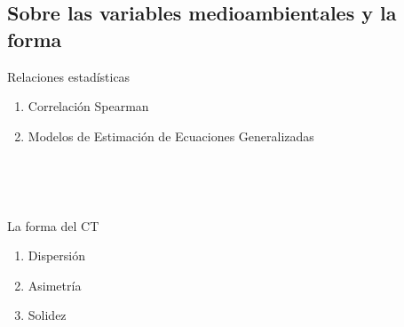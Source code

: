 \subsection{Sobre las variables medioambientales y la forma}

\begin{frame}
    \begin{alertblock}{Relaciones estadísticas}
        \begin{enumerate}
            \item Correlación Spearman
            \item Modelos de Estimación de Ecuaciones Generalizadas
        \end{enumerate}
        ~\
    \end{alertblock}
~\
    
    \begin{exampleblock}{La forma del CT}
        \begin{enumerate}
            \item Dispersión
            \item Asimetría
            \item Solidez
        \end{enumerate} 
        ~\
    \end{exampleblock}
\end{frame}
